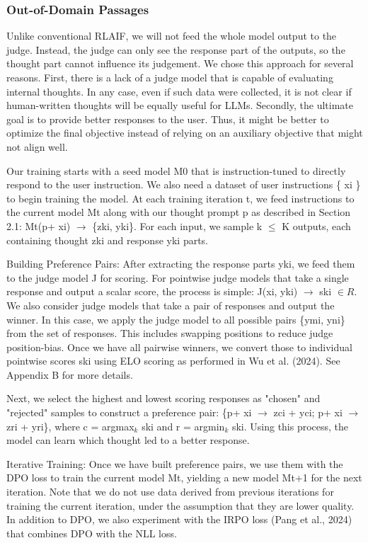 \documentclass[11pt]{article}
\begin{document}
\subsubsection{Out-of-Domain Passages}
\begin{mdframed}
Unlike conventional RLAIF, we will not feed the whole model output to the judge. Instead, the judge can only see the response part of the outputs, so the thought part cannot influence its judgement. We chose this approach for several reasons. First, there is a lack of a judge model that is capable of evaluating internal thoughts. In any case, even if such data were collected, it is not clear if human-written thoughts will be equally useful for LLMs. Secondly, the ultimate goal is to provide better responses to the user. Thus, it might be better to optimize the final objective instead of relying on an auxiliary objective that might not align well.

Our training starts with a seed model M0 that is instruction-tuned to directly respond to the user instruction. We also need a dataset of user instructions \{ xi \} to begin training the model. At each training iteration t, we feed instructions to the current model Mt along with our thought prompt p as described in Section 2.1: 
Mt(p+ xi) \(\rightarrow\) \{zki, yki\}. For each input, we sample k \(\leq\) K outputs, each containing thought zki and response yki parts.

Building Preference Pairs: After extracting the response parts yki, we feed them to the judge model J for scoring. For pointwise judge models that take a single response and output a scalar score, the process is simple: J(xi, yki) \(\rightarrow\) ski \(\in R\). We also consider judge models that take a pair of responses and output the winner. In this case, we apply the judge model to all possible pairs \{ymi, yni\} from the set of responses. This includes swapping positions to reduce judge position-bias. Once we have all pairwise winners, we convert those to individual pointwise scores ski using ELO scoring as performed in Wu et al. (2024). See Appendix B for more details.

Next, we select the highest and lowest scoring responses as "chosen" and "rejected" samples to construct a preference pair: \{p+ xi \(\rightarrow\) zci + yci; p+ xi \(\rightarrow\) zri + yri\}, where c = argmax\(_k\) ski and r = argmin\(_k\) ski. Using this process, the model can learn which thought led to a better response.

Iterative Training: Once we have built preference pairs, we use them with the DPO loss to train the current model Mt, yielding a new model Mt+1 for the next iteration. Note that we do not use data derived from previous iterations for training the current iteration, under the assumption that they are lower quality. In addition to DPO, we also experiment with the IRPO loss (Pang et al., 2024) that combines DPO with the NLL loss.
\end{mdframed}
\end{document}
